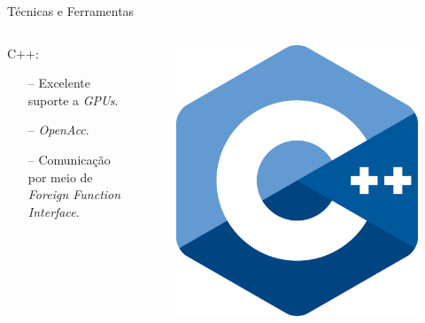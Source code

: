 \begin{frame}{Técnicas e Ferramentas}
    \begin{columns}
    \begin{column}{0.9\textwidth}
    C++:
    \begin{itemize}
        \item[--] Excelente suporte a \textit{GPUs}.
        \item[--] \textit{OpenAcc}.
        \item[--] Comunicação por meio de \textit{Foreign Function Interface}.
    \end{itemize}
    \end{column}

    \begin{column}{0.1\textwidth}
        \begin{figure}
            \includegraphics[width=\textwidth]{Figuras/C++ Logo.png}
        \end{figure}
    \end{column}
    \end{columns}
\end{frame}

